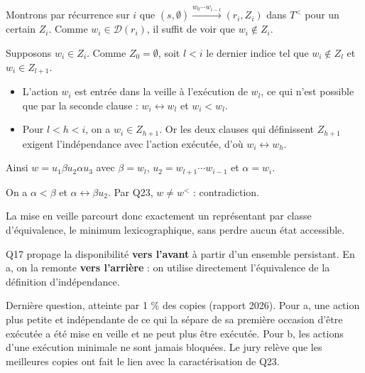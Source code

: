 \documentclass[11pt,a4paper]{article}
\providecommand{\tightlist}{\setlength{\itemsep}{0pt}\setlength{\parskip}{0pt}}
\providecommand{\varnothing}{\emptyset}
\newcommand{\equationajustee}[1]{%
  \sbox{\boiteequation}{$\displaystyle #1$}%
  \ifdim\wd\boiteequation>\linewidth
    \[\resizebox{\linewidth}{!}{\usebox{\boiteequation}}\]%
  \else
    \[#1\]%
  \fi}
\begin{document}
Montrons par récurrence sur \(i\) que \((s,\varnothing)\xrightarrow{w_0\cdots w_{i-1}}(r_i,Z_i)\) dans \(T^<\) pour un certain \(Z_i\). Comme \(w_i\in\mathcal D(r_i)\), il suffit de voir que \(w_i\notin Z_i\).

Supposons \(w_i\in Z_i\). Comme \(Z_0=\varnothing\), soit \(l<i\) le dernier indice tel que \(w_i\notin Z_l\) et \(w_i\in Z_{l+1}\).

\begin{itemize}
\tightlist
\item
  L'action \(w_i\) est entrée dans la veille à l'exécution de \(w_l\), ce qui n'est possible que par la seconde clause : \(w_i\leftrightarrow w_l\) et \(w_i<w_l\).
\item
  Pour \(l<h<i\), on a \(w_i\in Z_{h+1}\). Or les deux clauses qui définissent \(Z_{h+1}\) exigent l'indépendance avec l'action exécutée, d'où \(w_i\leftrightarrow w_h\).
\end{itemize}

Ainsi \(w=u_1\beta u_2\alpha u_3\) avec \(\beta=w_l\), \(u_2=w_{l+1}\cdots w_{i-1}\) et \(\alpha=w_i\).

On a \(\alpha<\beta\) et \(\alpha\leftrightarrow\beta u_2\). Par Q23, \(w\neq w^<\) : contradiction.

\equationajustee{\boxed{s\xrightarrow{u}s' \text{ dans } T \implies \exists Z,\ (s,\varnothing)\xrightarrow{u^<}(s',Z) \text{ dans } T^<}}

La mise en veille parcourt donc exactement un représentant par classe d'équivalence, le minimum lexicographique, sans perdre aucun état accessible.

\begin{piege}

Q17 propage la disponibilité \textbf{vers l'avant} à partir d'un ensemble persistant. En a, on la remonte \textbf{vers l'arrière} : on utilise directement l'équivalence de la définition d'indépendance.

\end{piege}

\begin{jury}

Dernière question, atteinte par 1 \% des copies (rapport 2026). Pour a, une action plus petite et indépendante de ce qui la sépare de sa première occasion d'être exécutée a été mise en veille et ne peut plus être exécutée. Pour b, les actions d'une exécution minimale ne sont jamais bloquées. Le jury relève que les meilleures copies ont fait le lien avec la caractérisation de Q23.

\end{jury}
\end{document}
